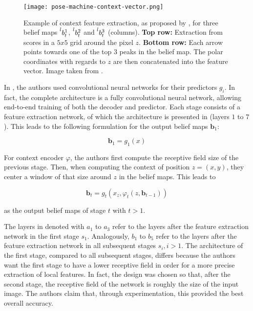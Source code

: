 \begin{figure}[htb!]
    \centering
    \texttt{[image: pose-machine-context-vector.png]}
    \caption{Example of context feature extraction, as proposed by \cite{ramakrishna_pose_2014}, for three belief maps $\prescript{l}{}{b_t^1}$, $\prescript{l}{}{b_t^2}$ and $\prescript{l}{}{b_t^3}$ (columns). \textbf{Top row:} Extraction from scores in a $5 x 5$ grid around the pixel $z$. \textbf{Bottom row:} Each arrow points towards one of the top $3$ peaks in the belief map. The polar coordinates with regards to $z$ are then concatenated into the feature vector. Image taken from \cite{ramakrishna_pose_2014}.}
    \label{fig:pose-machines-context}
\end{figure}


In \cite{wei_convolutional_2016}, the authors used convolutional neural networks for their predictors $g_i$.
In fact, the complete architecture is a fully convolutional neural network, allowing end-to-end training of both the decoder and predictor.
Each stage consists of a feature extraction network, of which the architecture is presented in  (layers $1$ to $7$).
This leads to the following formulation for the output belief maps $\bm{b}_1$:

\begin{equation}
    \bm{b}_1 = g_1 (x)
\end{equation}

For context encoder $\varphi$, the authors first compute the receptive field size of the previous stage.
Then, when computing the context of position $z = (x, y)$, they center a  window of that size around $z$ in the belief maps.
This leads to 

\begin{equation}
    \bm{b}_t = g_t(x_z, \varphi_t(z, \bm{b}_{t-1}))
\end{equation}

as the output belief maps of stage $t$ with $t > 1$.

The layers in  denoted with $a_1$ to $a_3$ refer to the layers after the feature extraction network in the first stage $s_1$.
Analogously, $b_1$ to $b_5$ refer to the layers after the feature extraction network in all subsequent stages $s_i, i > 1$.
The architecture of the first stage, compared to all subsequent stages, differs because the authors want the first stage to have a lower receptive field in order for a more precise extraction of local features.
In fact, the design was chosen so that, after the second stage, the receptive field of the network is roughly the size of the input image.
The authors claim that, through experimentation, this provided the best overall accuracy.

